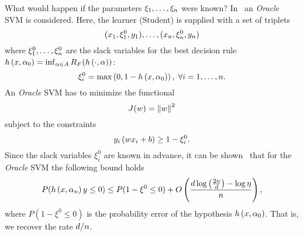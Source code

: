 What would happen if the parameters $\xi_1, \ldots, \xi_n$ were known?
In~\cite{VapnikI15a} an \emph{Oracle} SVM is considered. Here, the learner (Student) is supplied with a set of triplets
\begin{equation}
    \nonumber
    (x_1, \xi_1^0, y_1), \ldots, (x_n, \xi_n^0, y_n)
\end{equation}
where $\xi^0_1, \ldots, \xi^0_n$ are the slack variables for the best decision rule $h\left(x, \alpha_0\right) = \inf_{\alpha \in A} R_F(h\left(\cdot, \alpha\right)) $:
\begin{equation}
    \nonumber
    \xi_i^0 = \max \left(0, 1 - h\left(x, \alpha_0\right)  \right), \; \forall i = 1, \ldots, n .
\end{equation}
An \emph{Oracle} SVM has to minimize the functional
$$J(w) = \left\lVert w\right\rVert^2$$
subject to the constraints
$$y_i \left( w x_i + b \right) \geq 1 - \xi_i^0 .$$
Since the slack variables $\xi_i^0$ are known in advance, it can be shown~\cite{VapnikV09} that for the \emph{Oracle} SVM the following bound holds
\begin{equation}
    \nonumber
    P(h\left(x, \alpha_n\right) y \leq 0) \leq P(1 - \xi^0 \leq 0) + O\left( \frac{d \log\left(\frac{2n}{d} \right) - \log\eta}{n}  \right) ,
\end{equation}
where $P(1 - \xi^0 \leq 0)$ is the probability error of the hypothesis $h\left(x, \alpha_0\right)$.
That is, we recover the rate $d/n$.

